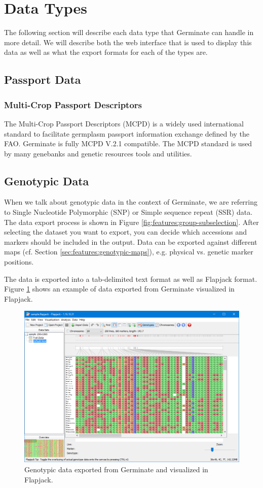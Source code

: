 \section{Data Types}
The following section will describe each data type that Germinate can handle in more detail. We will describe both the web interface that is used to display this data as well as what the export formats for each of the types are.

\subsection{Passport Data}

\subsubsection{Multi-Crop Passport Descriptors}
The Multi-Crop Passport Descriptors (MCPD) \cite{mcpd} is a widely used international standard to facilitate germplasm passport information exchange defined by the FAO. Germinate is fully MCPD V.2.1 compatible. The MCPD standard is used by many genebanks and genetic resources tools and utilities.

\subsection{Genotypic Data}
When we talk about genotypic data in the context of Germinate, we are referring to Single Nucleotide Polymorphic (SNP) or Simple sequence repeat (SSR) data. The data export process is shown in Figure \ref{fig:features:group-subselection}. After selecting the dataset you want to export, you can decide which accessions and markers should be included in the output. Data can be exported against different maps (cf. Section \ref{sec:features:genotypic-maps}), e.g. physical vs. genetic marker positions.

The data is exported into a tab-delimited text format as well as Flapjack \cite{flapjack} format. Figure \ref{fig:features:genotypic-data-flapjack} shows an example of data exported from Germinate visualized in Flapjack.

\begin{figure}
	\centering
	\includegraphics[width=0.85\linewidth]{img/features/genotypic-data-flapjack.png}
	\caption{Genotypic data exported from Germinate and visualized in Flapjack.}
	\label{fig:features:genotypic-data-flapjack}
\end{figure}

